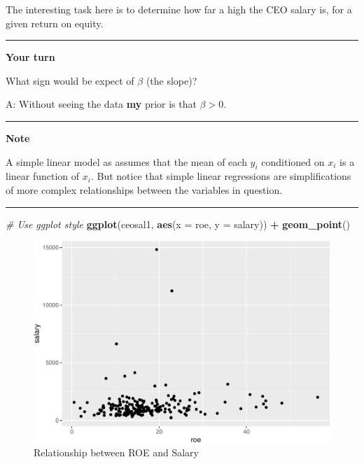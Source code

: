 \documentclass[]{book}
\newenvironment{Shaded}{\begin{snugshade}}{\end{snugshade}}
\newcommand{\CommentTok}[1]{\textcolor[rgb]{0.56,0.35,0.01}{\textit{#1}}}
\newcommand{\DataTypeTok}[1]{\textcolor[rgb]{0.13,0.29,0.53}{#1}}
\newcommand{\KeywordTok}[1]{\textcolor[rgb]{0.13,0.29,0.53}{\textbf{#1}}}
\newcommand{\NormalTok}[1]{#1}
\newcommand{\OperatorTok}[1]{\textcolor[rgb]{0.81,0.36,0.00}{\textbf{#1}}}
\newcommand{\StringTok}[1]{\textcolor[rgb]{0.31,0.60,0.02}{#1}}
\begin{document}
The interesting task here is to determine how far a high the CEO salary
is, for a given return on equity.

\begin{center}\rule{0.5\linewidth}{\linethickness}\end{center}

\textbf{Your turn}

What sign would be expect of \(\beta\) (the slope)?

A: Without seeing the data \textbf{my} prior is that \(\beta > 0\).

\begin{center}\rule{0.5\linewidth}{\linethickness}\end{center}

\textbf{Note}

A simple linear model as assumes that the mean of each \(y_{i}\)
conditioned on \(x_{i}\) is a linear function of \(x_{i}\). But notice
that simple linear regressions are simplifications of more complex
relationships between the variables in question.

\begin{center}\rule{0.5\linewidth}{\linethickness}\end{center}

\begin{Shaded}
\begin{Highlighting}[]
\CommentTok{# Use ggplot style}
\KeywordTok{ggplot}\NormalTok{(ceosal1, }\KeywordTok{aes}\NormalTok{(}\DataTypeTok{x =}\NormalTok{ roe, }\DataTypeTok{y =}\NormalTok{ salary)) }\OperatorTok{+}
\StringTok{  }\KeywordTok{geom_point}\NormalTok{()}
\end{Highlighting}
\end{Shaded}

\begin{figure}
\centering
\includegraphics{MEM5220_R_files/figure-latex/ceosal1-1.pdf}
\caption{\label{fig:ceosal1}Relationship between ROE and Salary}
\end{figure}
\end{document}
